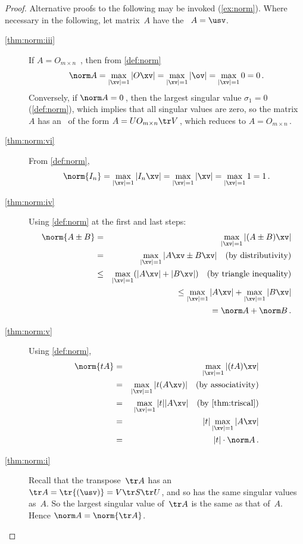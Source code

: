 \begin{proof}  Alternative proofs to the following may be invoked (\cref{ex:norm}).
Where necessary in the following, let matrix~\(A\) have the \svd\ \(A=\usv\).
\begin{description}
\item[\ref{thm:norm:iii}]
If \(A=O_{m\times n}\) \,,
then from \cref{def:norm} 
\begin{equation*}
\norm A=\max_{|\xv|=1}|O\xv|
=\max_{|\xv|=1}|\ov|=\max_{|\xv|=1}0=0\,.
\end{equation*}
Conversely, if \(\norm A=0\)\,, then the largest singular value \(\sigma_1=0\) (\cref{def:norm}), which implies that all singular values are zero, so the matrix~\(A\) has an \svd\ of the form \(A=UO_{m\times n}\tr V\)\,, which reduces to \(A=O_{m\times n}\)\,.

\item[\ref{thm:norm:vi}] From \cref{def:norm}, 
\begin{equation*}
\norm{I_n}=\max_{|\xv|=1}|I_n\xv|
=\max_{|\xv|=1}|\xv|
=\max_{|\xv|=1}1
=1\,.
\end{equation*}


\item[\ref{thm:norm:iv}]
Using \cref{def:norm} at the first and last steps:
\begin{eqnarray*}
\norm{A\pm B}
&=&\max_{|\xv|=1}|(A\pm B)\xv|
\\&=&\max_{|\xv|=1}|A\xv\pm B\xv|
\quad(\text{by distributivity})
\\&\leq&\max_{|\xv|=1}(|A\xv|+ |B\xv|)
\quad(\text{by triangle inequality})
\\&&{}\leq\max_{|\xv|=1}|A\xv|+ \max_{|\xv|=1}|B\xv|
\\&&{}\phantom{\leq}=\norm A+ \norm B\,.
\end{eqnarray*}

\item[\ref{thm:norm:v}]
Using \cref{def:norm},
\begin{eqnarray*}
\norm{tA}
&=&\max_{|\xv|=1}|(tA)\xv|
\\&=&\max_{|\xv|=1}|t(A\xv)|
\quad(\text{by associativity})
\\&=&\max_{|\xv|=1}|t||A\xv|
\quad(\text{by \cref{thm:triscal}})
\\&=&|t|\max_{|\xv|=1}|A\xv|
\\&=&|t|\cdot\norm A\,.
\end{eqnarray*}

\item[\ref{thm:norm:i}]
Recall that the transpose~\(\tr A\) has an \svd\ \(\tr A=\tr{(\usv)}=V\tr S\tr U\), and so has the same singular values as~\(A\).
So the largest singular value of~\(\tr A\) is the same as that of~\(A\).
Hence \(\norm A=\norm{\tr A}\).


\end{description}
\end{proof}
